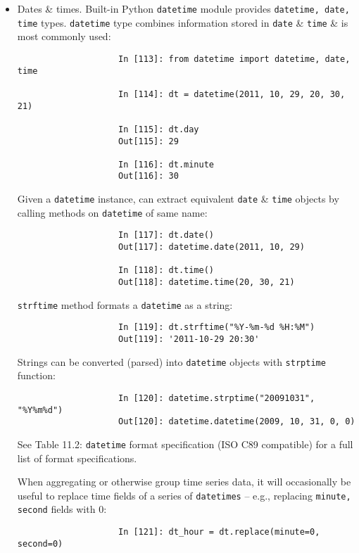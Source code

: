 \documentclass{article}
\begin{document}
\begin{itemize}
\begin{itemize}
\begin{itemize}
\begin{itemize}
\begin{verbatim}
					In [110]: a is None
					Out[110]: True
					
					In [111]: b = 5
					
					In [112]: b is not None
					Out[112]: True
				\end{verbatim}
				{\tt None} is also a common default value for function arguments:
				\begin{verbatim}
					def add_and_maybe_multiply(a, b, c = None):
					result = a + b
					
					if c is not None:
					result = result * c
					
					return result
				\end{verbatim}
				\item {\sf Dates \& times.} Built-in Python {\tt datetime} module provides {\tt datetime, date, time} types. {\tt datetime} type combines information stored in {\tt date} \& {\tt time} \& is most commonly used:
				\begin{verbatim}
					In [113]: from datetime import datetime, date, time
					
					In [114]: dt = datetime(2011, 10, 29, 20, 30, 21)
					
					In [115]: dt.day
					Out[115]: 29
					
					In [116]: dt.minute
					Out[116]: 30
				\end{verbatim}
				Given a {\tt datetime} instance, can extract equivalent {\tt date} \& {\tt time} objects by calling methods on {\tt datetime} of same name:
				\begin{verbatim}
					In [117]: dt.date()
					Out[117]: datetime.date(2011, 10, 29)
					
					In [118]: dt.time()
					Out[118]: datetime.time(20, 30, 21)
				\end{verbatim}
				{\tt strftime} method formats a {\tt datetime} as a string:
				\begin{verbatim}
					In [119]: dt.strftime("%Y-%m-%d %H:%M")
					Out[119]: '2011-10-29 20:30'
				\end{verbatim}
				Strings can be converted (parsed) into {\tt datetime} objects with {\tt strptime} function:
				\begin{verbatim}
					In [120]: datetime.strptime("20091031", "%Y%m%d")
					Out[120]: datetime.datetime(2009, 10, 31, 0, 0)
				\end{verbatim}
				See {\sf Table 11.2: {\tt datetime} format specification (ISO C89 compatible)} for a full list of format specifications.
				
				When aggregating or otherwise group time series data, it will occasionally be useful to replace time fields of a series of {\tt datetimes} -- e.g., replacing {\tt minute, second} fields with 0:
				\begin{verbatim}
					In [121]: dt_hour = dt.replace(minute=0, second=0)
					

\end{verbatim}
\end{itemize}
\end{itemize}
\end{itemize}
\end{itemize}
\end{document}
